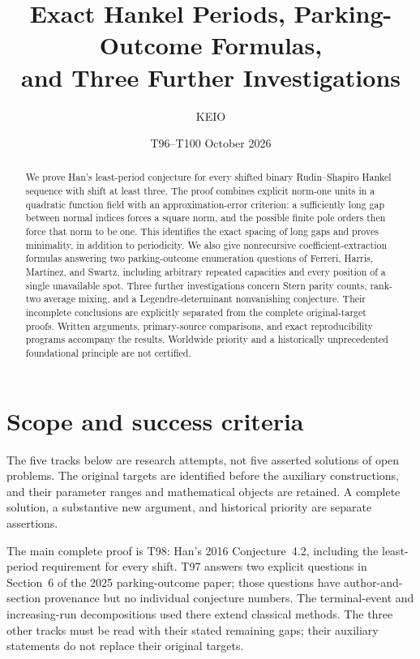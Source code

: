 \documentclass[11pt,a4paper]{article}
\theoremstyle{definition}
\theoremstyle{remark}
\begin{document}
\title{Exact Hankel Periods, Parking-Outcome Formulas,\\
and Three Further Investigations}
\author{KEIO}
\date{T96--T100\quad\textbar{} October 2026}
\maketitle
\begin{abstract}
We prove Han's least-period conjecture for every shifted binary
Rudin--Shapiro Hankel sequence with shift at least three. The proof
combines explicit norm-one units in a quadratic function field with an
approximation-error criterion: a sufficiently long gap between normal
indices forces a square norm, and the possible finite pole orders then
force that norm to be one. This identifies the exact spacing of long
gaps and proves minimality, in addition to periodicity.
We also give nonrecursive coefficient-extraction formulas answering two
parking-outcome enumeration questions of Ferreri, Harris, Martinez, and
Swartz, including arbitrary repeated capacities and every position of
a single unavailable spot. Three further investigations concern Stern
parity counts, rank-two average mixing, and a Legendre-determinant
nonvanishing conjecture. Their incomplete conclusions are explicitly
separated from the complete original-target proofs. Written arguments,
primary-source comparisons, and exact reproducibility programs accompany
the results. Worldwide priority and a historically unprecedented
foundational principle are not certified.
\end{abstract}

\section*{Scope and success criteria}
The five tracks below are research attempts, not five asserted solutions
of open problems. The original targets are identified before the
auxiliary constructions, and their parameter ranges and mathematical
objects are retained. A complete solution, a substantive new argument,
and historical priority are separate assertions.

The main complete proof is T98: Han's 2016 Conjecture~4.2, including
the least-period requirement for every shift. T97 answers two explicit
questions in Section~6 of the 2025 parking-outcome paper; those questions
have author-and-section provenance but no individual conjecture numbers.
The terminal-event and increasing-run decompositions used there extend
classical methods. The three other tracks must be read with their stated
remaining gaps; their auxiliary statements do not replace their original
targets.
\end{document}

